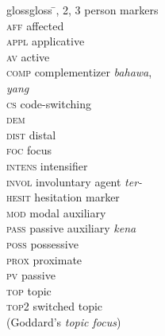 \documentclass[output=paper
,modfonts
,nonflat]{langsci/langscibook}
\begin{document}
\begin{multicols}{2}
	\begin{tabbing}
		glossgloss \= , 2, 3 \> person markers\\
		\textsc{aff} \> affected\\
		\textsc{appl} \> applicative\\
		\textsc{av} \> active \\
		\textsc{comp} \> complementizer \emph{bahawa},\\ \> \emph{yang}\\
		\textsc{cs} \> code-switching\\
		\textsc{dem} \> \\
		\textsc{dist} \> distal\\
		\textsc{foc} \> focus\\
		\textsc{intens} \> intensifier\\
		\textsc{invol} \> involuntary agent \emph{ter-}\\
		\textsc{hesit} \> hesitation marker\\
		\textsc{mod} \> modal auxiliary\\
		\textsc{pass} \> passive auxiliary \emph{kena}\\
		\textsc{poss} \> possessive\\
		\textsc{prox} \> proximate\\
		\textsc{pv} \> passive \\
		\textsc{top} \> topic\\
		\textsc{top2} \> switched topic \\ \> (Goddard's \emph{topic focus})
	\end{tabbing}
\end{multicols}

\sloppy
\printbibliography[heading=subbibliography,notkeyword=this]
\end{document}
